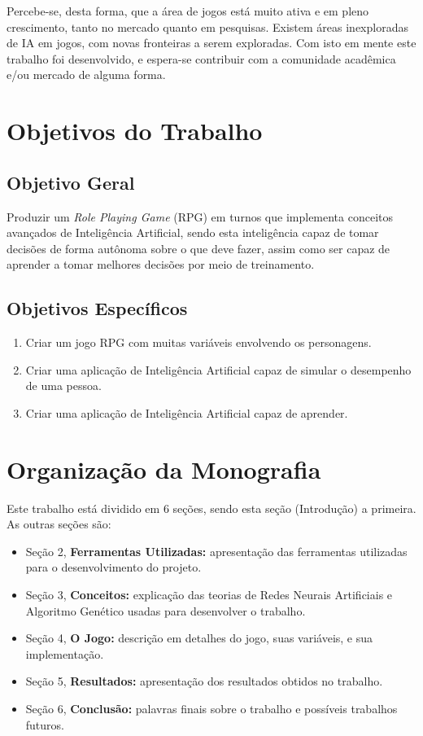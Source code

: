 \documentclass[
	12pt,					%
	openright,				%
	oneside,				%
	a4paper,				%
	bibjustif,				%
	chapter=TITLE,			%
	english,				%
	brazil,					%
	]{abntex2}
\begin{document}
	Percebe-se, desta forma, que a área de jogos está muito ativa e em pleno crescimento,
	tanto no mercado quanto em pesquisas.
	Existem áreas inexploradas de IA em jogos,
	com novas fronteiras a serem exploradas.
	Com isto em mente este trabalho foi desenvolvido,
	e espera-se contribuir com a comunidade acadêmica e/ou mercado de alguma forma.

	\FloatBarrier
	\section{Objetivos do Trabalho}
	
		\FloatBarrier
		\subsection{Objetivo Geral}
			Produzir um \textit{Role Playing Game} (RPG) em turnos que implementa conceitos avançados de Inteligência Artificial,
			sendo esta inteligência capaz de tomar decisões de forma autônoma sobre o que deve fazer,
			assim como ser capaz de aprender a tomar melhores decisões por meio de treinamento.
		
		\FloatBarrier
		\subsection{Objetivos Específicos}
			\begin{enumerate}[noitemsep]
				\item Criar um jogo RPG com muitas variáveis envolvendo os personagens.
				\item Criar uma aplicação de Inteligência Artificial capaz de simular o desempenho de uma pessoa.
				\item Criar uma aplicação de Inteligência Artificial capaz de aprender.
			\end{enumerate}			
	
	\FloatBarrier
	\section{Organização da Monografia}
		Este trabalho está dividido em 6 seções, sendo esta seção (Introdução) a primeira. As outras seções são:
		\begin{itemize}[noitemsep]
     		\item Seção 2, \textbf{Ferramentas Utilizadas:} apresentação das ferramentas utilizadas para o desenvolvimento do projeto.
     		\item Seção 3, \textbf{Conceitos:} explicação das teorias de Redes Neurais Artificiais e Algoritmo Genético usadas para desenvolver o trabalho.
     		\item Seção 4, \textbf{O Jogo:} descrição em detalhes do jogo, suas variáveis, e sua implementação.
     		\item Seção 5, \textbf{Resultados:} apresentação dos resultados obtidos no trabalho.
     		\item Seção 6, \textbf{Conclusão:} palavras finais sobre o trabalho e possíveis trabalhos futuros.
  	 	\end{itemize}
\end{document}

